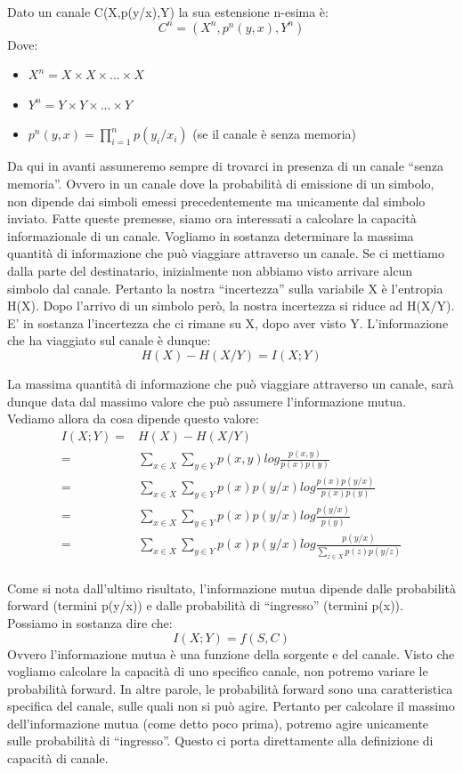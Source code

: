 \bigskip

\begin{definizione}
 Dato un canale C(X,p(y/x),Y) la sua estensione n-esima è:
\[
 C^n=(X^n,p^n(y,x),Y^n)
\]
Dove:
\begin{itemize}
 \item $X^n=X \times X \times ... \times X$
 \item $Y^n=Y \times Y \times ... \times Y$
 \item $p^n(y,x)=\prod_{i=1}^n p(y_i/x_i)$ (se il canale è senza memoria)
\end{itemize}
\end{definizione}

\bigskip

Da qui in avanti assumeremo sempre di trovarci in presenza di un canale ``senza memoria''. Ovvero in un canale dove la probabilità 
di emissione di un simbolo, non dipende dai simboli emessi precedentemente ma unicamente dal simbolo inviato.
Fatte queste premesse, siamo ora interessati a calcolare la capacità informazionale di un canale. Vogliamo in sostanza determinare 
la massima quantità di informazione che può viaggiare attraverso un canale. Se ci mettiamo dalla parte del destinatario, inizialmente 
non abbiamo visto arrivare alcun simbolo dal canale. Pertanto la nostra ``incertezza'' sulla variabile X è l'entropia H(X). Dopo l'arrivo di un simbolo però, la nostra incertezza si riduce ad H(X/Y). E' in sostanza l'incertezza che ci rimane su X, dopo aver 
visto Y. L'informazione che ha viaggiato sul canale è dunque:
\[
 H(X)-H(X/Y)=I(X;Y)
\]

La massima quantità di informazione che può viaggiare attraverso un canale, sarà dunque data dal massimo valore che può 
assumere l'informazione mutua. Vediamo allora da cosa dipende questo valore:
\[\begin{split}
 I(X;Y)=&H(X)-H(X/Y) \\
        =&\sum_{x \in X} \sum_{y \in Y} p(x,y) log \frac{p(x,y)}{p(x)p(y)} \\
        =&\sum_{x \in X} \sum_{y \in Y} p(x)p(y/x) log \frac{p(x)p(y/x)}{p(x)p(y)} \\
        =&\sum_{x \in X} \sum_{y \in Y} p(x)p(y/x) log \frac{p(y/x)}{p(y)} \\
        =&\sum_{x \in X} \sum_{y \in Y} p(x)p(y/x) log \frac{p(y/x)}{ \displaystyle\sum_{z \in X} p(z)p(y/z)} \\
  \end{split}
\]

Come si nota dall'ultimo risultato, l'informazione mutua dipende dalle probabilità forward (termini p(y/x)) e dalle probabilità di ``ingresso'' (termini p(x)).
Possiamo in sostanza dire che:
\[
 I(X;Y)=f(S,C)
\]
Ovvero l'informazione mutua è una funzione della sorgente e del canale. Visto che vogliamo calcolare la capacità di uno specifico canale, non potremo variare le probabilità forward. In altre parole, le probabilità forward sono una caratteristica specifica del canale, sulle quali non si può agire. Pertanto per calcolare il massimo dell'informazione mutua (come detto poco prima), potremo agire 
unicamente sulle probabilità di ``ingresso''. Questo ci porta direttamente alla definizione di capacità di canale.

